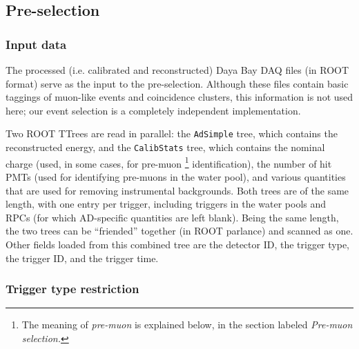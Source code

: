 \documentclass[../thesis.tex]{subfiles}
\begin{document}
\subsection{Pre-selection}
\label{sec:selPreSel}

\subsubsection{Input data}
\label{sec:selInputData}

The processed (i.e. calibrated and reconstructed) Daya Bay DAQ files (in ROOT format) serve as the input to the pre-selection. Although these files contain basic taggings of muon-like events and coincidence clusters, this information is not used here; our event selection is a completely independent implementation.

Two ROOT TTrees are read in parallel: the \texttt{AdSimple} tree, which contains the reconstructed energy, and the \texttt{CalibStats} tree, which contains the nominal charge (used, in some cases, for pre-muon%
\footnote{The meaning of \emph{pre-muon} is explained below, in the section labeled \emph{Pre-muon selection.}}
identification), the number of hit PMTs (used for identifying pre-muons in the water pool), and various quantities that are used for removing instrumental backgrounds. Both trees are of the same length, with one entry per trigger, including triggers in the water pools and RPCs (for which AD-specific quantities are left blank). Being the same length, the two trees can be ``friended'' together (in ROOT parlance) and scanned as one. Other fields loaded from this combined tree are the detector ID, the trigger type, the trigger ID, and the trigger time.

\subsubsection{Trigger type restriction}
\label{sec:selTrigType}
\end{document}
